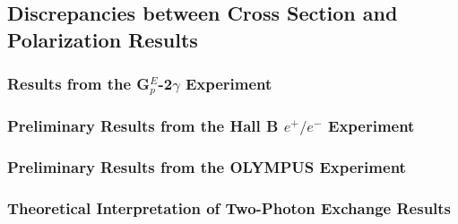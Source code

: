 \subsection{Discrepancies between Cross Section and Polarization Results}
\label{subsec:discrepancies}

\subsubsection{Results from the G$^E_p$-2$\gamma$ Experiment}
\label{subsubsec:gep2g}

\subsubsection{Preliminary Results from the Hall B $e^+/e^-$ Experiment}
\label{subsubsec:hallb}

\subsubsection{Preliminary Results from the OLYMPUS Experiment}
\label{subsubsec:olympus}

\subsubsection{Theoretical Interpretation of Two-Photon Exchange Results}
\label{subsubsec:tpetheory}

